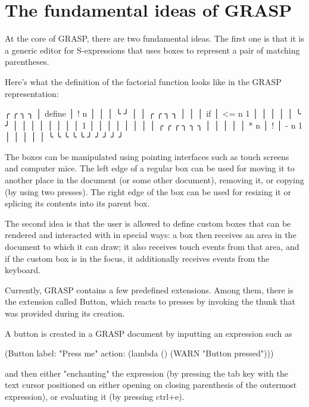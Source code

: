 \documentclass[acmsmall]{acmart}
\newenvironment{Snippet}{\Verbatim[samepage=true]}{\endVerbatim}
\begin{document}
\section{The fundamental ideas of GRASP}
\label{sec:org9d4d4a3}

At the core of GRASP, there are two fundamental ideas.  The first one
is that it is a generic editor for S-expressions that uses boxes to
represent a pair of matching parentheses.

Here's what the definition of the factorial function looks like
in the GRASP representation:

\begin{Snippet}
╭        ╭     ╮                      ╮
│ define │ ! n │                      │
│        ╰     ╯                      │
│   ╭    ╭        ╮                 ╮ │
│   │ if │ <= n 1 │                 │ │
│   │    ╰        ╯                 │ │
│   │                               │ │
│   │       1                       │ │
│   │                               │ │
│   │       ╭     ╭   ╭       ╮ ╮ ╮ │ │
│   │       │ * n │ ! │ - n 1 │ │ │ │ │
╰   ╰       ╰     ╰   ╰       ╯ ╯ ╯ ╯ ╯
\end{Snippet}

The boxes can be manipulated using pointing interfaces such as touch
screens and computer mice. The left edge of a regular box can be used for
moving it to another place in the document (or some other document),
removing it, or copying (by using two presses). The right edge
of the box can be used for resizing it or splicing its contents
into its parent box.

The second idea is that the user is allowed to define custom boxes
that can be rendered and interacted with in special ways: a box then
receives an area in the document to which it can draw; it also
receives touch events from that area, and if the custom box is in the
focus, it additionally receives events from the keyboard.

Currently, GRASP contains a few predefined extensions. Among them,
there is the extension called Button, which reacts to presses by
invoking the thunk that was provided during its creation.

A button is created in a GRASP document by inputting an expression
such as

\begin{Snippet}
(Button label: "Press me" 
	action: (lambda () (WARN "Button pressed")))
\end{Snippet}

and then either "enchanting" the expression (by pressing the
tab key with the text cursor positioned on either opening
on closing parenthesis of the outermost expression),
or evaluating it (by pressing ctrl+e).
\end{document}
